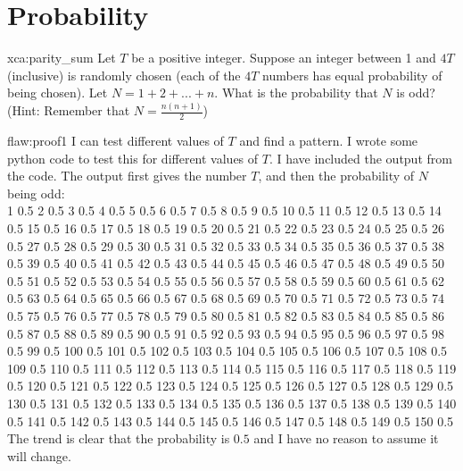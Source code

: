 \section{Probability}

\begin{xca}{xca:parity_sum}
Let $T$ be a positive integer. Suppose an integer between 1 and $4T$ (inclusive) is randomly chosen (each of the $4T$ numbers has equal probability of being chosen). Let $N = 1 + 2 + ... + n$. What is the probability that $N$ is odd? (Hint: Remember that $N = \frac{n(n+1)}{2}$)
\end{xca}

\begin{flaw}{flaw:proof1} %
I can test different values of $T$ and find a pattern. I wrote some python code to test this for different values of $T$. I have included the output from the code. The output first gives the number $T$, and then the probability of $N$ being odd:\\

1 0.5 2 0.5 3 0.5 4 0.5 5 0.5 6 0.5 7 0.5 8 0.5 9 0.5 10 0.5 11 0.5 12 0.5 13 0.5 14 0.5 15 0.5 16 0.5 17 0.5 18 0.5 19 0.5 20 0.5 21 0.5 22 0.5 23 0.5 24 0.5 25 0.5 26 0.5 27 0.5 28 0.5 29 0.5 30 0.5 31 0.5 32 0.5 33 0.5 34 0.5 35 0.5 36 0.5 37 0.5 38 0.5 39 0.5 40 0.5 41 0.5 42 0.5 43 0.5 44 0.5 45 0.5 46 0.5 47 0.5 48 0.5 49 0.5 50 0.5 51 0.5 52 0.5 53 0.5 54 0.5 55 0.5 56 0.5 57 0.5 58 0.5 59 0.5 60 0.5 61 0.5 62 0.5 63 0.5 64 0.5 65 0.5 66 0.5 67 0.5 68 0.5 69 0.5 70 0.5 71 0.5 72 0.5 73 0.5 74 0.5 75 0.5 76 0.5 77 0.5 78 0.5 79 0.5 80 0.5 81 0.5 82 0.5 83 0.5 84 0.5 85 0.5 86 0.5 87 0.5 88 0.5 89 0.5 90 0.5 91 0.5 92 0.5 93 0.5 94 0.5 95 0.5 96 0.5 97 0.5 98 0.5 99 0.5 100 0.5 101 0.5 102 0.5 103 0.5 104 0.5 105 0.5 106 0.5 107 0.5 108 0.5 109 0.5 110 0.5 111 0.5 112 0.5 113 0.5 114 0.5 115 0.5 116 0.5 117 0.5 118 0.5 119 0.5 120 0.5 121 0.5 122 0.5 123 0.5 124 0.5 125 0.5 126 0.5 127 0.5 128 0.5 129 0.5 130 0.5 131 0.5 132 0.5 133 0.5 134 0.5 135 0.5 136 0.5 137 0.5 138 0.5 139 0.5 140 0.5 141 0.5 142 0.5 143 0.5 144 0.5 145 0.5 146 0.5 147 0.5 148 0.5 149 0.5 150 0.5\\

The trend is clear that the probability is $0.5$ and I have no reason to assume it will change. 
\end{flaw}

